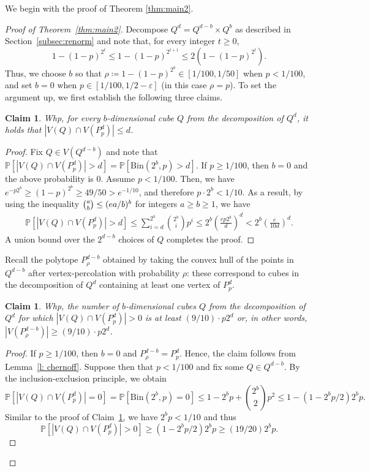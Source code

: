 \documentclass{article}
\newtheorem{claim}[thm]{Claim}
\theoremstyle{definition}
\begin{document}
We begin with the proof of Theorem \ref{thm:main2}.
\begin{proof}[Proof of Theorem~\ref{thm:main2}]
Decompose $Q^d=Q^{d-b}\times Q^b$ as described in Section~\ref{subsec:renorm} and note that, for every integer $t\ge 0$,
\[1-(1-p)^{2^t}\le 1-(1-p)^{2^{t+1}}\le 2(1-(1-p)^{2^t}).\]
Thus, we choose $b$ so that $\rho \coloneqq 1-(1-p)^{2^b}\in[1/100,1/50]$ when $p<1/100$, and set $b=0$ when $p\in[1/100,1/2-\varepsilon]$ (in this case $\rho=p$). 
To set the argument up, we first establish the following three claims.
\begin{claim}\label{itm: small intersection}
Whp, for every $b$-dimensional cube $Q$ from the decomposition of $Q^d$, it holds that $|V(Q)\cap V(P^d_p)|\leq d$.
\end{claim}
\begin{proof}
     Fix $Q\in V(Q^{d-b})$ and note that $\mathbb P[|V(Q)\cap V(P^d_p)|>d]=\mathbb P[\mathrm{Bin}(2^b,p)>d]$. 
     If $p\geq 1/100$, then $b=0$ and the above probability is $0$. 
     Assume $p<1/100$. Then, we have $e^{-p{2^b}}\ge (1-p)^{2^b}\ge 49/50>e^{-1/10}$, and therefore $p\cdot 2^b< 1/10$. As a result, by using the inequality $\tbinom{a}{b}\le (ea/b)^b$ for integers $a\ge b\ge 1$, we have
    \begin{align*}
        \mathbb P[|V(Q)\cap V(P^d_p)|>d]\le \sum_{i=d}^{2^b}\binom{2^b}{i}p^i\le 2^b\left(\frac{ep2^b}{d}\right)^{d}<2^b\left(\frac{e}{10d}\right)^{d}.
    \end{align*}
    A union bound over the $2^{d-b}$ choices of $Q$ completes the proof.
\end{proof}

Recall the polytope $P^{d-b}_{\rho}$ obtained by taking the convex hull of the points in $Q^{d-b}$ after vertex-percolation with probability $\rho$: these correspond to cubes in the decomposition of $Q^d$ containing at least one vertex of $P^d_p$.

\begin{claim}\label{itm: enough cubes}
Whp, the number of $b$-dimensional cubes $Q$ from the decomposition of $Q^d$ for which $|V(Q)\cap V(P^d_p)|>0$ is at least $(9/10)\cdot p2^{d}$ or, in other words, $|V(P^{d-b}_{\rho})|\geq (9/10)\cdot p2^d$.
\end{claim}
\begin{proof}
If $p\geq 1/100$, then $b=0$ and $P^{d-b}_\rho=P^{d}_p$. 
Hence, the claim follows from Lemma~\ref{l: chernoff}. Suppose then that $p<1/100$ and fix some $Q\in Q^{d-b}$. By the inclusion-exclusion principle, we obtain
\[\mathbb P[|V(Q)\cap V(P^d_p)|=0]=\mathbb P[\mathrm{Bin}(2^b,p)=0]\leq 1-2^bp+\binom{2^b}{2}p^2\leq 1-(1-2^bp/2)2^bp.\]
Similar to the proof of Claim~\ref{itm: small intersection}, we have $2^bp<1/10$ and thus
\[\mathbb P[|V(Q)\cap V(P^d_p)|>0] \ge (1-2^bp/2)2^bp \geq (19/20)2^bp.\]


\end{proof}
\end{proof}
\end{document}
